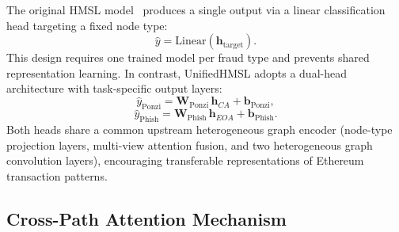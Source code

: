 \documentclass[conference]{IEEEtran}
\begin{document}
The original HMSL model~\cite{paper_baseline_2408.00641} produces a
single output via a linear classification head targeting a fixed node
type:
\begin{equation}
\hat{y} = \mathrm{Linear}(\mathbf{h}_{\mathrm{target}}).
\end{equation}
This design requires one trained model per fraud type and prevents
shared representation learning. In contrast, UnifiedHMSL adopts a
dual-head architecture with task-specific output layers:
\begin{equation}
\hat{y}_{\mathrm{Ponzi}} = \mathbf{W}_{\mathrm{Ponzi}}\,
  \mathbf{h}_{CA} + \mathbf{b}_{\mathrm{Ponzi}},
\end{equation}
\begin{equation}
\hat{y}_{\mathrm{Phish}} = \mathbf{W}_{\mathrm{Phish}}\,
  \mathbf{h}_{EOA} + \mathbf{b}_{\mathrm{Phish}}.
\end{equation}
Both heads share a common upstream heterogeneous graph encoder
(node-type projection layers, multi-view attention fusion, and two
heterogeneous graph convolution layers), encouraging transferable
representations of Ethereum transaction patterns.

\subsection{Cross-Path Attention Mechanism}
\end{document}
